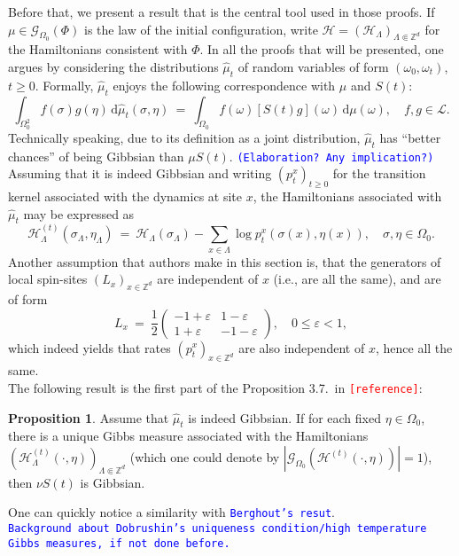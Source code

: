 \documentclass[12pt]{article}
\renewcommand{\d}{\mathrm{d}}
\newcommand{\G}{\mathcal{G}}
\renewcommand{\H}{\mathcal{H}}
\newcommand{\Loc}{\mathcal{L}}
\newcommand{\Z}{\mathbb{Z}}
\newcommand{\pika}{\boldsymbol{\cdot}}
\newcommand{\1}{\mathbbm{1}}
\newcommand{\5}{\vspace{0.5cm}}
\renewcommand{\hat}{\widehat}
\theoremstyle{definition}
\newtheorem{prop}[thm]{Proposition}
\begin{document}
Before that, we present a result that is the central tool used in those proofs. If $\mu\in\G_{\Omega_0}(\Phi)$ is the law of the initial configuration, write $\H=(\H_\Lambda)_{\Lambda\Subset\Z^d}$ for the Hamiltonians consistent with $\Phi$. In all the proofs that will be presented, one argues by considering the distributions $\hat{\mu}_t$ of random variables of form $(\omega_0,\omega_t)$, $t\geq 0$. Formally, $\hat{\mu}_t$ enjoys the following correspondence with $\mu$ and $S(t)$:
$$\int_{\Omega_0^2} f(\sigma)g(\eta)\,\d\hat{\mu}_t(\sigma,\eta) ~=~ \int_{\Omega_0}f(\omega)[S(t)g](\omega)\,\d\mu(\omega), \quad f,g\in\Loc.$$
Technically speaking, due to its definition as a joint distribution, $\hat{\mu}_t$ has ``better chances'' of being Gibbsian than $\mu S(t)$. \textcolor{blue}{\texttt{(Elaboration? Any implication?)}} Assuming that it is indeed Gibbsian and writing $(p_t^x)_{t\geq 0}$ for the transition kernel associated with the dynamics at site $x$, the Hamiltonians associated with $\hat{\mu}_t$ may be expressed as
$$\H_\Lambda^{(t)}(\sigma_\Lambda,\eta_\Lambda) ~=~ \H_\Lambda(\sigma_\Lambda) - \sum_{x\in\Lambda}\log p_t^x(\sigma(x),\eta(x)), \quad \sigma,\eta\in\Omega_0.$$
Another assumption that authors make in this section is, that the generators of local spin-sites $(L_x)_{x\in\Z^d}$ are independent of $x$ (i.e., are all the same), and are of form
$$L_x ~=~ \frac{1}{2}\begin{pmatrix}
-1+\varepsilon & 1-\varepsilon \\
1+\varepsilon & -1-\varepsilon
\end{pmatrix}, \quad 0\leq \varepsilon<1,$$
which indeed yields that rates $(p_t^x)_{x\in\Z^d}$ are also independent of $x$, hence all the same.\\

The following result is the first part of the Proposition 3.7.~in \textcolor{red}{\texttt{[reference]}}:
\begin{prop}
Assume that $\hat{\mu}_t$ is indeed Gibbsian. If for each fixed $\eta\in\Omega_0$, there is a unique Gibbs measure associated with the Hamiltonians $(\H_\Lambda^{(t)}(\pika,\eta))_{\Lambda\Subset\Z^d}$ (which one could denote by $|\G_{\Omega_0}(\H^{(t)}(\pika,\eta))|=1$), then $\nu S(t)$ is Gibbsian.
\end{prop}
One can quickly notice a similarity with \textcolor{blue}{\texttt{Berghout's resut}}. \\

\textcolor{blue}{\texttt{Background about Dobrushin's uniqueness condition/high temperature Gibbs measures, if not done before.}}\\
\end{document}
